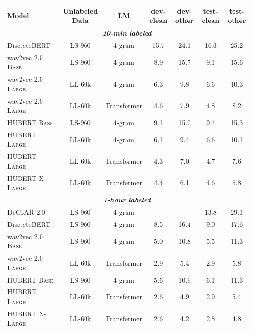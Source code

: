 
\begin{table}[t]
    \centering
    \begin{tabular}{lcccccc}
        \toprule
        Model & Unlabeled Data & LM & dev-clean & dev-other & test-clean & test-other \\
        \midrule\midrule
        \multicolumn{7}{c}{\textit{\textbf{10-min labeled}}} \\
        DiscreteBERT~\cite{baevski2019effectiveness} & LS-960 & 4-gram & 15.7 & 24.1 & 16.3 & 25.2 \\
        wav2vec 2.0 \textsc{Base}~\cite{baevski2020wav2vec}   & LS-960 & 4-gram & 8.9 & 15.7 & 9.1 & 15.6 \\
        wav2vec 2.0 \textsc{Large}~\cite{baevski2020wav2vec}  & LL-60k & 4-gram & 6.3 & 9.8 & 6.6 & 10.3  \\
        wav2vec 2.0 \textsc{Large}~\cite{baevski2020wav2vec}  & LL-60k & Transformer & 4.6 & 7.9 & 4.8 & 8.2 \\
        \midrule
        HUBERT \textsc{Base}    & LS-960 & 4-gram & 9.1 & 15.0 & 9.7 & 15.3  \\
        HUBERT \textsc{Large}   & LL-60k & 4-gram & 6.1 & 9.4 & 6.6 & 10.1 \\
        HUBERT \textsc{Large}   & LL-60k & Transformer & 4.3 & 7.0 & 4.7 & 7.6 \\
        HUBERT \textsc{X-Large} & LL-60k & Transformer & 4.4 & 6.1 & 4.6 & 6.8 \\
        
        \midrule\midrule
        \multicolumn{7}{c}{\textit{\textbf{1-hour labeled}}} \\
        DeCoAR 2.0~\cite{ling2020decoar} & LS-960 & 4-gram & - & - & 13.8 & 29.1 \\
        DiscreteBERT~\cite{baevski2019effectiveness} & LS-960 & 4-gram & 8.5 & 16.4 & 9.0 & 17.6 \\
        wav2vec 2.0 \textsc{Base}~\cite{baevski2020wav2vec}   & LS-960 & 4-gram & 5.0 & 10.8 & 5.5 & 11.3 \\
        wav2vec 2.0 \textsc{Large}~\cite{baevski2020wav2vec}  & LL-60k & Transformer & 2.9 & 5.4 & 2.9 & 5.8 \\
        \midrule
        HUBERT \textsc{Base}    & LS-960 & 4-gram & 5.6 & 10.9 & 6.1 & 11.3  \\
        HUBERT \textsc{Large}   & LL-60k & Transformer & 2.6 & 4.9 & 2.9 & 5.4 \\
        HUBERT \textsc{X-Large} & LL-60k & Transformer & 2.6 & 4.2 & 2.8 & 4.8 \\
        

\end{tabular}
\end{table}
